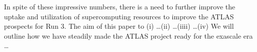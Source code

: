 In spite of these impressive numbers, there is a need to further improve the
uptake and utilization of supercomputing resources to improve the ATLAS
prospects for Run 3. The aim of this paper to (i) \ldots (ii) \ldots (iiii)
\ldots (iv) We will outline how we have steadily made the ATLAS project ready
for the exascale era \ldots 

